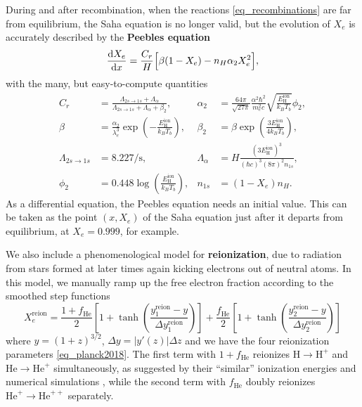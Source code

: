 \documentclass[10pt,a4paper]{article}
\begin{document}
During and after recombination, when the reactions \eqref{eq_recombinations} are far from equilibrium,
the Saha equation is no longer valid,
but the evolution of $X_e$ is accurately described by the \textbf{Peebles equation}
\begin{equation}
	\odv{X_e}{x} = \frac{C_r}{H} \Big[ \beta (1-X_e) - n_H \alpha_2 X_e^2 \Big],
\label{eq_Peebles}
\end{equation}
with the many, but easy-to-compute quantities
\begin{align*}
	C_r &= \frac{\Lambda_{2s \rightarrow 1s} + \Lambda_\alpha}{\Lambda_{2s \rightarrow 1s} + \Lambda_\alpha + \beta_2}, &
	\alpha_2 &= \frac{64 \pi}{\sqrt{27 \pi}} \frac{\alpha^2 \hbar^2}{m_e^2 c} \sqrt{\frac{E^\text{ion}_\text{H}}{k_B T_b}} \phi_2, \\
	\beta &= \frac{\alpha_2}{\lambda_e^3} \exp \left(-\frac{E^\text{ion}_\text{H}}{k_B T_b}\right), &
	\beta_2 &= \beta \exp \left(\frac{3 E^\text{ion}_\text{H}}{4 k_B T_b}\right), \\
	\Lambda_{2s \rightarrow 1s} &= 8.227 / \mathrm{s}, &
	\Lambda_\alpha &= H \frac{(3 E^\text{ion}_{\text{H}})^3}{(\hbar c)^3 (8 \pi)^2 n_{1s}}, \\
	\phi_2 &= 0.448 \log \left( \frac{E^\text{ion}_\text{H}}{k_B T_b} \right), &
	n_{1s} &= (1-X_e) n_H.
\end{align*}
As a differential equation, the Peebles equation needs an initial value.
This can be taken as the point $(x, X_e)$ of the Saha equation just after it departs from equilibrium, at $X_e = 0.999$, for example.

We also include a phenomenological model for \textbf{reionization}, due to radiation from stars formed at later times again kicking electrons out of neutral atoms.
In this model, we manually ramp up the free electron fraction according to the smoothed step functions
\begin{equation}
	X_e^\text{reion} = \frac{1+f_\text{He}}{2} \left[ 1 + \tanh \left( \frac{y^\text{reion}_1-y}{\Delta y^\text{reion}_1} \right) \right]
                     + \frac{f_\text{He}}{2} \left[ 1 + \tanh \left( \frac{y^\text{reion}_2-y}{\Delta y^\text{reion}_2} \right) \right]
\label{eq_reionization}
\end{equation}
where $y = (1+z)^{3/2}$, $\Delta y = |y'(z)| \Delta z$ and we have the four reionization parameters \eqref{eq_planck2018}.
The first term with $1+f_\text{He}$ reionizes $\text{H} \rightarrow \text{H}^+$ and $\text{He} \rightarrow \text{He}^+$ simultaneously,
as suggested by their ``similar'' ionization energies and numerical simulations \cite[appendix B]{lewisCosmologicalParametersWMAP2008},
while the second term with $f_\text{He}$ doubly reionizes $\text{He}^{+} \rightarrow \text{He}^{++}$ separately.
\end{document}
